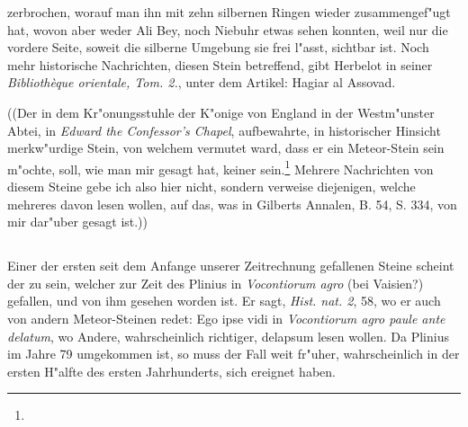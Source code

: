 \documentclass[a4paper, 11pt, oneside, polutonikogreek, german]{article}
\begin{document}
zerbrochen, worauf man ihn mit zehn silbernen Ringen wieder zusammengef"ugt hat, wovon aber weder Ali Bey, noch Niebuhr etwas sehen konnten, weil nur die vordere Seite, soweit die silberne Umgebung sie frei l"asst, sichtbar ist. Noch mehr historische Nachrichten, diesen Stein betreffend, gibt Herbelot in seiner \emph{Bibliothèque orientale, Tom. 2.}, unter dem Artikel: Hagiar al Assovad.

((Der in dem Kr"onungsstuhle der K"onige von England in der Westm"unster Abtei, in \emph{Edward the Confessor's Chapel}, aufbewahrte, in historischer Hinsicht merkw"urdige Stein, von welchem vermutet ward, dass er ein Meteor-Stein sein m"ochte, soll, wie man mir gesagt hat, keiner sein.\footnote{} Mehrere Nachrichten von diesem Steine gebe ich also hier nicht, sondern verweise diejenigen, welche mehreres davon lesen wollen, auf das, was in Gilberts Annalen, B. 54, S. 334, von mir dar"uber gesagt ist.))
\subsection{}
\paragraph{}
Einer der ersten seit dem Anfange unserer Zeitrechnung gefallenen Steine scheint der zu sein, welcher zur Zeit des Plinius in \emph{Vocontiorum agro} (bei Vaisien?) gefallen, und von ihm gesehen worden ist. Er sagt, \emph{Hist. nat. 2}, 58, wo er auch von andern Meteor-Steinen redet: Ego ipse vidi in \emph{Vocontiorum agro paule ante delatum}, wo Andere, wahrscheinlich richtiger, delapsum lesen wollen. Da Plinius im Jahre 79 umgekommen ist, so muss der Fall weit fr"uher, wahrscheinlich in der ersten H"alfte des ersten Jahrhunderts, sich ereignet haben.
\end{document}
